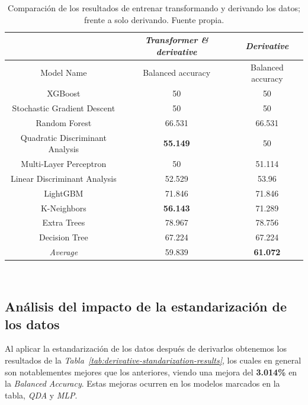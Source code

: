 \begin{table}[!h]
    \centering
    \begin{tabular}{|c|c|c|}
        \hline
            & \textit{Transformer \& derivative} & \textit{Derivative} \\ \hline
            Model Name & Balanced accuracy & Balanced accuracy \\ \hline
            XGBoost & 50 & 50 \\ 
            Stochastic Gradient Descent & 50 & 50 \\ 
            Random Forest & 66.531 & 66.531 \\ 
            Quadratic Discriminant Analysis & \textbf{55.149} & 50 \\ 
            Multi-Layer Perceptron & 50 & 51.114 \\ 
            Linear Discriminant Analysis & 52.529 & 53.96 \\ 
            LightGBM & 71.846 & 71.846 \\ 
            K-Neighbors & \textbf{56.143} & 71.289 \\ 
            Extra Trees & 78.967 & 78.756 \\ 
            Decision Tree & 67.224 & 67.224 \\ \hline
            \textit{Average} & 59.839 & \textbf{61.072} \\ \hline
    \end{tabular}
    \caption{Comparación de los resultados de entrenar transformando y derivando los datos; frente a solo derivando. Fuente propia.}\ \label{tab:derivative-transformed-results}
\end{table}

\subsection{Análisis del impacto de la estandarización de los datos}

Al aplicar la estandarización de los datos después de derivarlos obtenemos los resultados de la \textit{Tabla\ \ref{tab:derivative-standarization-results}}, los cuales en general son notablementes mejores que los anteriores, viendo una mejora del \textbf{3.014\%} en la \textit{Balanced Accuracy}. Estas mejoras ocurren en los modelos marcados en la tabla, \textit{QDA} y \textit{MLP}.


